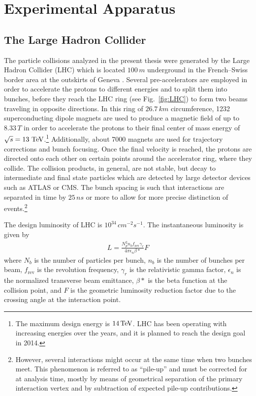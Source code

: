\chapter{Experimental Apparatus}
\section{The Large Hadron Collider}
The particle collisions analyzed in the present thesis were generated by the Large Hadron Collider (LHC) which is located $100\,\unit{m}$ underground in the French--Swiss border area at the outskirts of Geneva \cite{1748-0221-3-08-S08001}. Several pre-accelerators are employed in order to accelerate the protons to different energies and to split them into bunches, before they reach the LHC ring (see Fig.~\ref{fig:LHC}) to form two beams traveling in opposite directions. In this ring of $26.7\,\unit{km}$ circumference, 1232 superconducting dipole magnets are used to produce a magnetic field of up to $8.33\,\unit{T}$ in order to accelerate the protons to their final center of mass energy of $\sqrt{s} = 13\,\,\text{Te\hspace{-.08em}V}$.\footnote{The maximum design energy is $14\,\text{Te\hspace{-.08em}V}$. LHC has been operating with increasing energies over the years, and it is planned to reach the design goal in 2014.} Additionally, about 7000 magnets are used for trajectory corrections and bunch focusing. Once the final velocity is reached, the protons are directed onto each other on certain points around the accelerator ring, where they collide. The collision products, in general, are not stable, but decay to intermediate and final state particles which are detected by large detector devices such as ATLAS or CMS. The bunch spacing is such that interactions are separated in time by $25\,\unit{ns}$ or more to allow for more precise distinction of events.\footnote{However, several interactions might occur at the same time when two bunches meet. This phenomenon is referred to as ``pile-up'' and must be corrected for at analysis time, mostly by means of geometrical separation of the primary interaction vertex and by subtraction of expected pile-up contributions.}

The design luminosity of LHC is $10^{34}\,\unit{cm^{-2}s^{-1}}$. The instantaneous luminosity is given by
\begin{eqnarray}
	L = \frac{N_p^2 n_b f_\text{rev} \gamma_r}{4\pi \epsilon_n \beta*} F
\end{eqnarray}
where $N_b$ is the number of particles per bunch, $n_b$ is the number of bunches per beam, $f_\text{rev}$ is the revolution frequency, $\gamma_r$ is the relativistic gamma factor, $\epsilon_n$ is the normalized transverse beam emittance, $\beta*$ is the beta function at the collision point, and $F$ is the geometric luminosity reduction factor due to the crossing angle at the interaction point.

